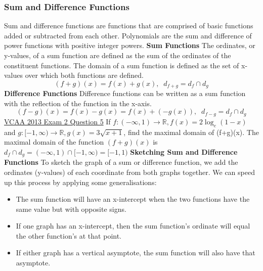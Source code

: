 \documentclass{article}
\begin{document}
			\subsubsection{Sum and Difference Functions}
				Sum and difference functions are functions that are comprised of basic functions added or subtracted from each other. Polynomials are the sum and difference of power functions with positive integer powers.\newline\newline
				\textbf{Sum Functions}\newline
				The ordinates, or y-values, of a sum function are defined as the sum of the ordinates of the constituent functions. The domain of a sum function is defined as the set of x-values over which both functions are defined.\newline
				\[(f+g)(x)=f(x)+g(x),\;\;d_{f+g}=d_f\cap d_g\]
				\noindent\textbf{Difference Functions}\newline
				Difference functions can be written as a sum function with the reflection of the function in the x-axis.\newline
				\[(f-g)(x)=f(x)-g(x)=f(x)+(-g(x)),\;\;d_{f-g}=d_f\cap d_g\]
				\underline{VCAA 2013 Exam 2 Question 5}\newline
				If $f:(-\infty,1)\to\mathbb{R},f(x)=2\log_e(1-x)$ and $g:[-1,\infty)\to\mathbb{R},g(x)=3\sqrt{x+1}$, find the maximal domain of (f+g)(x).\newline\newline
				The maximal domain of the function $(f+g)(x)$ is $d_f\cap d_g=(-\infty,1)\cap[-1,\infty)=[-1,1)$
				\newline\newline
				\textbf{Sketching Sum and Difference Functions}\newline
				To sketch the graph of a sum or difference function, we add the ordinates (y-values) of each coordinate from both graphs together. We can speed up this process by applying some generalisations:\newline
				\begin{itemize}
					\item The sum function will have an x-intercept when the two functions have the same value but with opposite signs.
					\item If one graph has an x-intercept, then the sum function's ordinate will equal the other function's at that point.
					\item If either graph has a vertical asymptote, the sum function will also have that asymptote.
				\end{itemize}
\end{document}
